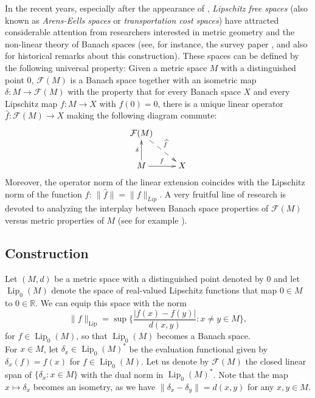 \documentclass[12pt,leqno]{amsart}
\numberwithin{equation}{section} %
\theoremstyle{definition}
\numberwithin{equation}{section}
\def\Lip{\operatorname{Lip}}
\begin{document}
In the recent years, especially after the appearance of \cite{Weaver}, \textit{Lipschitz free spaces} (also known as \textit{Arens-Eells spaces} or \textit{transportation cost spaces}) have attracted considerable attention from researchers interested in metric geometry and the non-linear theory of Banach spaces (see, for instance, the survey paper \cite{Godefroy}, and also \cite[1.6]{OO19} for historical remarks about this construction). These spaces can be defined by the following universal property: Given a metric space $M$ with a distinguished point $0$, $\mathcal F(M)$ is a Banach space together with an isometric map $\delta:M\rightarrow \mathcal F(M)$ with the property that for every Banach space $X$ and every Lipschitz map $f:M\rightarrow X$ with $f(0)=0$, there is a unique linear operator $\widehat f:\mathcal F(M)\rightarrow X$ making  the following diagram commute:
$$
\xymatrix{\mathcal F(M)\ar@{-->}^{\widehat f}[rd]&\\
     M\ar[r]^{f}\ar^{\delta}[u]& X}
$$
Moreover, the operator norm of the linear extension coincides with the Lipschitz norm of the function $f$: $\|\widehat f\|=\|f\|_{Lip}.$ A very fruitful line of research is devoted to analyzing the interplay between Banach space properties of $\mathcal F(M)$ versus metric properties of $M$ (see for example \cite{AGPP, AP, cutDou, CDW, god, GK, GO}). %


\subsection{Construction}

Let $(M,d)$ be a metric space with a distinguished point denoted by $0$ and let $\Lip_0(M)$ denote the space of real-valued Lipschitz functions that map $0\in M$ to $0\in\mathbb R$. We can equip this space with the norm $$\|f\|_{\Lip}=\sup\Big\{\frac{|f(x)-f(y)|}{d(x,y)}:x\neq y\in M\Big\},$$ for $f\in \Lip_0(M)$, so that $\Lip_0(M)$ becomes a Banach space.\\

For $x\in M$, let $\delta_x\in \Lip_0(M)^*$ be the evaluation functional given by $\delta_x(f)=f(x)$ for $f\in \Lip_0(M)$. Let us denote by $\mathcal F(M)$ the closed linear span of $\{\delta_x:x\in M\}$ with the dual norm in $\Lip_0(M)^*$. Note that the map $x\mapsto \delta_x$ becomes an isometry, as we have $\|\delta_x-\delta_y\|=d(x,y)$ for any $x,y\in M$.\\
\end{document}
